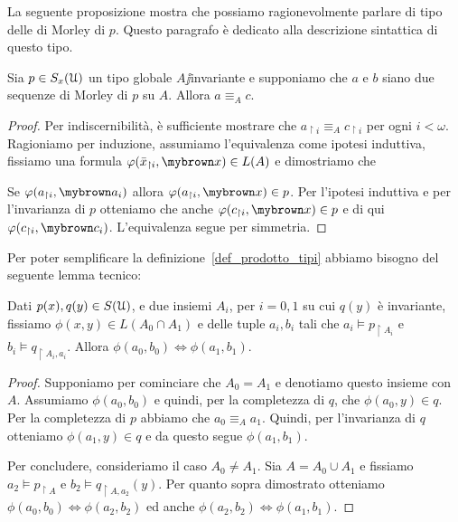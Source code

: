 La seguente proposizione mostra che possiamo ragionevolmente parlare di tipo delle di Morley di $p$. Questo paragrafo \`e dedicato alla descrizione sintattica di questo tipo.

\begin{proposition}\label{prop_tiposequenzaMorley}
Sia $p\in S_x(\EuScript U)$ un tipo globale $A\jj$invariante e supponiamo che $a$ e $b$ siano due sequenze di Morley di $p$ su $A$. Allora $a\equiv_A c$. 
\end{proposition}
\begin{proof}
Per indiscernibilit\`a, \`e sufficiente mostrare che $a_{\restriction i}\equiv_Ac_{\restriction i}$ per ogni $i<\omega$. Ragioniamo per induzione, assumiamo l'equivalenza come ipotesi induttiva, fissiamo una formula $\phi(\bar x_{\restriction i},{\mr x})\in L(A)$ e dimostriamo che 


Se $\phi(a_{\restriction i},{\mr a_i})$ allora $\phi(a_{\restriction i},{\mr x})\in p$. Per l'ipotesi induttiva e per l'invarianza di $p$ otteniamo che anche  $\phi(c_{\restriction i},{\mr x})\in p$ e di qui $\phi(c_{\restriction i},{\mr c_i})$. L'equivalenza segue per simmetria.
\end{proof}

Per poter semplificare la definizione~\ref{def_prodotto_tipi} abbiamo bisogno del seguente lemma tecnico:

\begin{lemma}\label{lemma_prodotto}
Dati $p(x), q(y)\in S(\EuScript U)$, e due insiemi $A_i$, per $i=0,1$ su cui $q(y)$ \`e invariante, fissiamo $\phi(x,y)\in L(A_0\cap A_1)$ e delle tuple $a_i,b_i$ tali che $a_i\models p_{\restriction A_i}$ e $b_i\models q_{\restriction A_i,a_i}$. Allora $\phi(a_0,b_0)\iff\phi(a_1,b_1)$.
\end{lemma}
\begin{proof}
Supponiamo per cominciare che $A_0=A_1$ e denotiamo questo insieme con $A$. Assumiamo $\phi(a_0,b_0)$ e quindi, per la completezza di $q$, che $\phi(a_0,y)\in q$. Per la completezza di $p$  abbiamo che $a_0\equiv_Aa_1$. Quindi, per l'invarianza di $q$ otteniamo $\phi(a_1,y)\in q$ e da questo segue $\phi(a_1,b_1)$.

Per concludere, consideriamo il caso $A_0\neq A_1$. Sia $A=A_0\cup A_1$ e fissiamo $a_2\models  p_{\restriction A}$ e $b_2\models q_{\restriction A,a_2}(y)$. Per quanto sopra dimostrato otteniamo $\phi(a_0,b_0)\iff\phi(a_2,b_2)$ ed anche $\phi(a_2,b_2)\iff\phi(a_1,b_1)$.
\end{proof}

